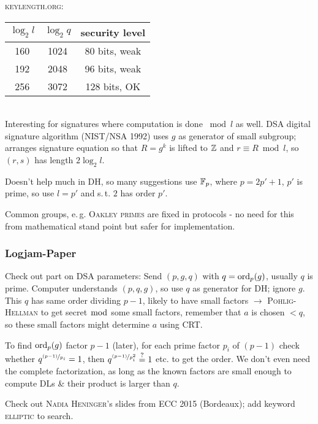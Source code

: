 \textsc{keylength.org}:

\begin{tabular}{c|c|c}
$\log_2 l$ & $\log_2 q$ & security level \\
\hline
160 & 1024 & 80 bits, weak \\
192 & 2048 & 96 bits, weak \\
256 & 3072 & 128 bits, OK
\end{tabular}\ \\

Interesting for signatures where computation is done $\bmod l$ as well. \textsc{DSA} digital signature algorithm (\textsc{NIST/NSA 1992}) uses $g$ as generator of small subgroup; arranges signature equation so that $R = g^k$ is lifted to $\mathbb{Z}$ and $r \equiv R \bmod l$,  so $(r,s)$ has length $2 \log_2 l$.

Doesn't help much in \textsc{DH}, so many suggestions use $\mathbb{F}_p$, where $p = 2p' + 1$, $p'$ is prime, so use $l = p'$ and s.\,t. $2$ has order $p'$.

Common groups, e.\,g. \textsc{Oakley primes} are fixed in protocols - no need for this from mathematical stand point but safer for implementation.

\subsubsection{Logjam-Paper}

Check out part on \textsc{DSA} parameters: Send $(p,g,q)$ with $q = \operatorname{ord}_p(g)$, usually $q$ is prime. Computer understands $(p,q,g)$, so use $q$ as generator for \textsc{DH}; ignore $g$. This $q$ has same order dividing $p-1$, likely to have small factors $\rightarrow$ \textsc{Pohlig-Hellman} to get secret $\bmod$ some small factors, remember that $a$ is chosen $< q$, so these small factors might determine $a$ using \textsc{CRT}.

To find $\operatorname{ord}_p(g)$ factor $p-1$ (later), for each prime factor $p_i$ of $(p-1)$ check whether $q^{\nicefrac{(p-1)}{p_i}} = 1$, then  $q^{\nicefrac{(p-1)}{p_i^2}} \overset{?}{=} 1$ etc. to get the order. We don't even need the complete factorization, as long as the known factors are small enough to compute \textsc{DL}s \& their product is larger than $q$.

\begin{remark}
Check out \textsc{Nadia Heninger}'s slides from \textsc{ECC 2015} (Bordeaux); add keyword \textsc{elliptic} to search.
\end{remark}
